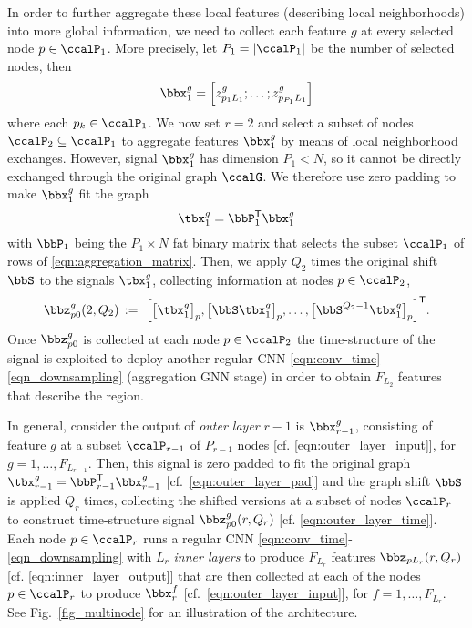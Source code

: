 In order to further aggregate these local features (describing local neighborhoods) into more global information, we need to collect each feature $g$ at every selected node $p \in \ccalP_{1}$. More precisely, let $P_{1} = |\ccalP_{1}|$ be the number of selected nodes, then
\begin{equation} \label{eqn:outer_layer_input}
	\bbx_{1}^{g} = \Big[ z_{p_{1}L_{1}}^{g};\ldots;z_{p_{P_{1}}L_{1}}^{g} \Big]
\end{equation}
where each $p_{k} \in \ccalP_{1}$. We now set $r=2$ and select a subset of nodes $\ccalP_{2} \subseteq \ccalP_{1}$ to aggregate features $\bbx_{1}^{g}$ by means of local neighborhood exchanges. However, signal $\bbx_{1}^{g}$ has dimension $P_{1} < N$, so it cannot be directly exchanged through the original graph $\ccalG$. We therefore use zero padding to make $\bbx_{1}^{g}$ fit the graph
\begin{equation} \label{eqn:outer_layer_pad}
	\tbx_{1}^{g} = \bbP_{1}^{\Tr} \bbx_{1}^{g}
\end{equation}
with $\bbP_{1} $ being the ${P_{1} \times N}$ fat binary matrix that selects the subset $\ccalP_{1}$ of rows of \eqref{eqn:aggregation_matrix}. Then, we apply $Q_{2}$ times the original shift $\bbS$ to the signals $\tbx_{1}^{g}$, collecting information at nodes $p \in \ccalP_{2}$,
\begin{equation} \label{eqn:outer_layer_time}
	\bbz_{p0}^{g}(2,Q_{2}) 
			\,:=\ \Big[ \big[          \tbx_{1}^g\big]_{p} , 
                        \big[\bbS      \tbx_{1}^g\big]_{p} , \ldots , 
                        \big[\bbS^{Q_{2}-1}\tbx_{1}^g\big]_{p} 
                  \Big]^{\Tr}.
\end{equation}
Once $\bbz_{p0}^{g}$ is collected at each node $p \in \ccalP_{2}$ the time-structure of the signal is exploited to deploy another regular CNN \eqref{eqn:conv_time}-\eqref{eqn_downsampling} (aggregation GNN stage) in order to obtain $F_{L_{2}}$ features that describe the region.

In general, consider the output of \emph{outer layer} $r-1$ is $\bbx_{r-1}^{g}$, consisting of feature $g$ at a subset $\ccalP_{r-1}$ of $P_{r-1}$ nodes [cf. \eqref{eqn:outer_layer_input}], for $g=1,\ldots,F_{L_{r-1}}$. Then, this signal is zero padded to fit the original graph $\tbx_{r-1}^{g}=\bbP_{r-1}^{\Tr}\bbx_{r-1}^{g}$ [cf.~\eqref{eqn:outer_layer_pad}] and the graph shift $\bbS$ is applied $Q_{r}$ times, collecting the shifted versions at a subset of nodes $\ccalP_{r}$ to construct time-structure signal $\bbz_{p0}^{g}(r,Q_{r})$ [cf. \eqref{eqn:outer_layer_time}]. Each node $p \in \ccalP_{r}$ runs a regular CNN \eqref{eqn:conv_time}-\eqref{eqn_downsampling} with $L_{r}$ \emph{inner layers} to produce $F_{L_{r}}$ features $\bbz_{pL_{r}}(r,Q_{r})$ [cf. \eqref{eqn:inner_layer_output}] that are then collected at each of the nodes $p \in \ccalP_{r}$ to produce $\bbx_{r}^{f}$ [cf.~\eqref{eqn:outer_layer_input}], for $f=1,\ldots,F_{L_{r}}$. See Fig.~\ref{fig_multinode} for an illustration of the architecture.

